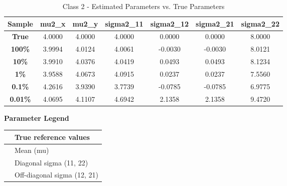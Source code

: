 \documentclass{article}
\begin{document}
\begin{table}[H]
\centering
\small
\caption{Class 2 - Estimated Parameters vs. True Parameters}
\vspace{-0.4em}
\begin{tabular}{ccccccc}
\toprule
\textbf{Sample} & \textbf{mu2\_x} & \textbf{mu2\_y} & \textbf{sigma2\_11} & \textbf{sigma2\_12} & \textbf{sigma2\_21} & \textbf{sigma2\_22} \\
\midrule
\textbf{True} & \cellcolor{trueyellow} 4.0000 & \cellcolor{trueyellow} 4.0000 & \cellcolor{trueyellow} 4.0000 & \cellcolor{trueyellow} 0.0000 & \cellcolor{trueyellow} 0.0000 & \cellcolor{trueyellow} 8.0000 \\
\textbf{100\%} & \cellcolor{meangreen} 3.9994 & \cellcolor{meangreen} 4.0124 & \cellcolor{sigmablue} 4.0061 & \cellcolor{offpurple} -0.0030 & \cellcolor{offpurple} -0.0030 & \cellcolor{sigmablue} 8.0121 \\
\textbf{10\%} & \cellcolor{meangreen} 3.9910 & \cellcolor{meangreen} 4.0376 & \cellcolor{sigmablue} 4.0419 & \cellcolor{offpurple} 0.0493 & \cellcolor{offpurple} 0.0493 & \cellcolor{sigmablue} 8.1234 \\
\textbf{1\%} & \cellcolor{meangreen} 3.9588 & \cellcolor{meangreen} 4.0673 & \cellcolor{sigmablue} 4.0915 & \cellcolor{offpurple} 0.0237 & \cellcolor{offpurple} 0.0237 & \cellcolor{sigmablue} 7.5560 \\
\textbf{0.1\%} & \cellcolor{meangreen} 4.2616 & \cellcolor{meangreen} 3.9390 & \cellcolor{sigmablue} 3.7739 & \cellcolor{offpurple} -0.0785 & \cellcolor{offpurple} -0.0785 & \cellcolor{sigmablue} 6.9775 \\
\textbf{0.01\%} & \cellcolor{meangreen} 4.0695 & \cellcolor{meangreen} 4.1107 & \cellcolor{sigmablue} 4.6942 & \cellcolor{offpurple} 2.1358 & \cellcolor{offpurple} 2.1358 & \cellcolor{sigmablue} 9.4720 \\
\bottomrule
\end{tabular}
\end{table}

\begin{center}
\textbf{Parameter Legend} \\
\begin{tabular}{|l|l|}
\hline
\cellcolor{trueyellow} & True reference values \\ \hline
\cellcolor{meangreen} & Mean (mu) \\ \hline
\cellcolor{sigmablue} & Diagonal sigma (11, 22) \\ \hline
\cellcolor{offpurple} & Off-diagonal sigma (12, 21) \\ \hline
\end{tabular}
\end{center}
\end{document}
